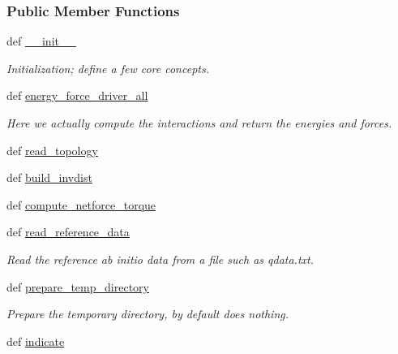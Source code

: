\subsubsection*{\-Public \-Member \-Functions}
\begin{DoxyCompactItemize}
\item 
def \hyperlink{classforcebalance_1_1abinitio__internal_1_1AbInitio__Internal_a464ef514107b9aa56d4d3d4bf0a03821}{\-\_\-\-\_\-init\-\_\-\-\_\-}
\begin{DoxyCompactList}\small\item\em \-Initialization; define a few core concepts. \end{DoxyCompactList}\item 
def \hyperlink{classforcebalance_1_1abinitio__internal_1_1AbInitio__Internal_a289dc4371654f7e3278363597c906c7f}{energy\-\_\-force\-\_\-driver\-\_\-all}
\begin{DoxyCompactList}\small\item\em \-Here we actually compute the interactions and return the energies and forces. \end{DoxyCompactList}\item 
def \hyperlink{classforcebalance_1_1abinitio_1_1AbInitio_a9f405c452a0a4081cd7da07938520920}{read\-\_\-topology}
\item 
def \hyperlink{classforcebalance_1_1abinitio_1_1AbInitio_a7475857193eefd4edd020d4f2a8fec17}{build\-\_\-invdist}
\item 
def \hyperlink{classforcebalance_1_1abinitio_1_1AbInitio_afbf86c26158a68cae7460b4106809fdd}{compute\-\_\-netforce\-\_\-torque}
\item 
def \hyperlink{classforcebalance_1_1abinitio_1_1AbInitio_aa73bedbf1e2cf19f2fa1e88815f1bd86}{read\-\_\-reference\-\_\-data}
\begin{DoxyCompactList}\small\item\em \-Read the reference ab initio data from a file such as qdata.\-txt. \end{DoxyCompactList}\item 
def \hyperlink{classforcebalance_1_1abinitio_1_1AbInitio_a2d0f465f1988fd6bc611f7de4b59fd04}{prepare\-\_\-temp\-\_\-directory}
\begin{DoxyCompactList}\small\item\em \-Prepare the temporary directory, by default does nothing. \end{DoxyCompactList}\item 
def \hyperlink{classforcebalance_1_1abinitio_1_1AbInitio_a3260db78e8c174f04a64661c4e5c181c}{indicate}

\end{DoxyCompactItemize}
